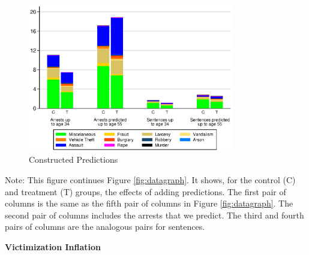 \documentclass[static]{JJH-Beamer}
\begin{document}
\begin{frame}

\begin{figure}[H]
\caption{Constructed Predictions}\label{fig:predictions}
\begin{center}
\includegraphics[width=0.8\textwidth]{AppOutput/Crime/predictions}
\end{center}
\end{figure}

\end{frame}

{\flushleft \normalsize Note: This figure continues Figure \ref{fig:datagraph}. It shows, for the control (C) and treatment (T) groups, the effects of adding predictions. The first pair of columns is the same as the fifth pair of columns in Figure \ref{fig:datagraph}. The second pair of columns includes the arrests that we predict. The third and fourth pairs of columns are the analogous pairs for sentences.\\}

\clearpage
\begin{frame}

\begin{center}
\textbf{Victimization Inflation}
\end{center}

\end{frame}
\end{document}
